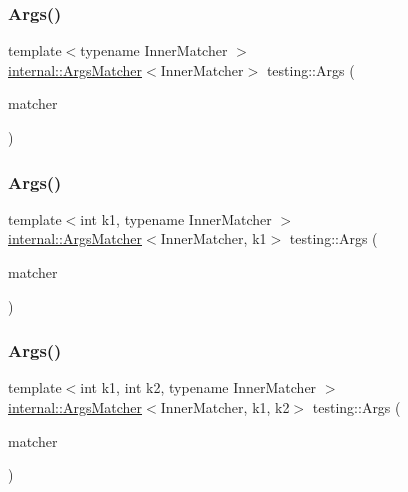 \mbox{\label{namespacetesting_aaca153f67b689b8b9d5b8c67ecf8cee4}} 
\subsubsection{\texorpdfstring{Args()}{Args()}\hspace{0.1cm}{\footnotesize\ttfamily [1/11]}}
{\footnotesize\ttfamily template$<$typename Inner\+Matcher $>$ \\
\mbox{\hyperlink{classtesting_1_1internal_1_1_args_matcher}{internal\+::\+Args\+Matcher}}$<$Inner\+Matcher$>$ testing\+::\+Args (\begin{DoxyParamCaption}\item[{const Inner\+Matcher \&}]{matcher }\end{DoxyParamCaption})\hspace{0.3cm}{\ttfamily [inline]}}

\mbox{\label{namespacetesting_af67bac6da407df7586f60cfa2c9b602d}} 
\subsubsection{\texorpdfstring{Args()}{Args()}\hspace{0.1cm}{\footnotesize\ttfamily [2/11]}}
{\footnotesize\ttfamily template$<$int k1, typename Inner\+Matcher $>$ \\
\mbox{\hyperlink{classtesting_1_1internal_1_1_args_matcher}{internal\+::\+Args\+Matcher}}$<$Inner\+Matcher, k1$>$ testing\+::\+Args (\begin{DoxyParamCaption}\item[{const Inner\+Matcher \&}]{matcher }\end{DoxyParamCaption})\hspace{0.3cm}{\ttfamily [inline]}}

\mbox{\label{namespacetesting_a663409e441584c81f496e9c98fd3453c}} 
\subsubsection{\texorpdfstring{Args()}{Args()}\hspace{0.1cm}{\footnotesize\ttfamily [3/11]}}
{\footnotesize\ttfamily template$<$int k1, int k2, typename Inner\+Matcher $>$ \\
\mbox{\hyperlink{classtesting_1_1internal_1_1_args_matcher}{internal\+::\+Args\+Matcher}}$<$Inner\+Matcher, k1, k2$>$ testing\+::\+Args (\begin{DoxyParamCaption}\item[{const Inner\+Matcher \&}]{matcher }\end{DoxyParamCaption})\hspace{0.3cm}{\ttfamily [inline]}}

